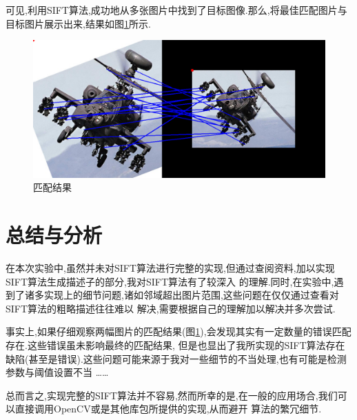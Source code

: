 \documentclass[a4paper]{article}
\begin{document}
可见,利用SIFT算法,成功地从多张图片中找到了目标图像.那么,将最佳匹配图片与目标图片展示出来,结果如图\ref{result}所示.
\begin{figure}[H]
\centering
\includegraphics[width=.8\textwidth]{img/Result.png}
\caption{匹配结果}
\label{result}
\end{figure}
\newpage
\section{总结与分析}
在本次实验中,虽然并未对SIFT算法进行完整的实现,但通过查阅资料,加以实现SIFT算法生成描述子的部分,我对SIFT算法有了较深入
的理解.同时,在实验中,遇到了诸多实现上的细节问题,诸如邻域超出图片范围,这些问题在仅仅通过查看对SIFT算法的粗略描述往往难以
解决,需要根据自己的理解加以解决并多次尝试.

事实上,如果仔细观察两幅图片的匹配结果(图\ref{result}),会发现其实有一定数量的错误匹配存在.这些错误虽未影响最终的匹配结果,
但是也显出了我所实现的SIFT算法存在缺陷(甚至是错误).这些问题可能来源于我对一些细节的不当处理,也有可能是检测参数与阈值设置不当
……

总而言之,实现完整的SIFT算法并不容易,然而所幸的是,在一般的应用场合,我们可以直接调用OpenCV或是其他库包所提供的实现,从而避开
算法的繁冗细节.
\end{document}

